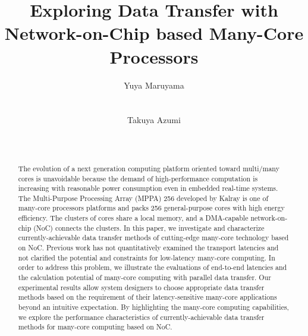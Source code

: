 \documentclass{sig-alternate-05-2015}
\author{
\alignauthor Yuya Maruyama\\
\affaddr{Graduate School of Engineering Science}\\
\affaddr{Osaka University}\\
\alignauthor Takuya Azumi\\
\affaddr{Graduate School of Engineering Science}\\
\affaddr{Osaka University}\\
}
\title{Exploring Data Transfer with Network-on-Chip based Many-Core Processors}
\begin{document}

\maketitle

\setcounter{topnumber}{5}%
\def\topfraction{1.00}%
\setcounter{bottomnumber}{5}%
\def\bottomfraction{1.00}%
\setcounter{totalnumber}{10}%
\def\textfraction{0.00}%


\begin{abstract}
The evolution of a next generation computing platform oriented toward multi/many cores is unavoidable because the demand of high-performance computation is increasing with reasonable power consumption even in embedded real-time systems.
The Multi-Purpose Processing Array (MPPA) 256 developed by Kalray is one of many-core processors platforms and packs 256 general-purpose cores with high energy efficiency.
The clusters of cores share a local memory, and a DMA-capable network-on-chip (NoC) connects the clusters.
In this paper, we investigate and characterize currently-achievable data transfer methods of cutting-edge many-core technology based on NoC.
Previous work has not quantitatively examined the transport latencies and not clarified the potential and constraints for low-latency many-core computing.
In order to address this problem, we illustrate the evaluations of end-to-end latencies and the calculation potential of many-core computing with parallel data transfer.
Our experimental results allow system designers to choose appropriate data transfer methods based on the requirement of their latency-sensitive many-core applications beyond an intuitive expectation.
By highlighting the many-core computing capabilities, we explore the performance characteristics of currently-achievable data transfer methods for many-core computing based on NoC.
\end{abstract}
\end{document}
